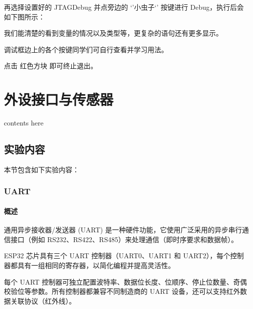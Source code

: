 \documentclass[a4paper,12pt,english]{sphinxmanual}
\begin{document}
{{\sphinxAtStartPar
再选择设置好的 JTAGDebug 并点旁边的 ‘’小虫子‘’ 按键进行 Debug，执行后会如下图所示：

\sphinxAtStartPar
{}

\sphinxAtStartPar
我们能清楚的看到变量的情况以及类型等，更复杂的语句还有更多显示。

\sphinxAtStartPar
调试框边上的各个按键同学们可自行查看并学习用法。

\sphinxAtStartPar
点击 红色方块 即可终止退出。

\sphinxAtStartPar
{}

\sphinxstepscope


\section{外设接口与传感器}
\label{\detokenize{exp-esp32/peripherals/index:id1}}\label{\detokenize{exp-esp32/peripherals/index::doc}}
\sphinxAtStartPar
contents here


\subsection{实验内容}
\label{\detokenize{exp-esp32/peripherals/index:id2}}
\sphinxAtStartPar
本节包含如下实验内容：

\sphinxstepscope


\subsubsection{UART}
\label{\detokenize{exp-esp32/peripherals/uart:uart}}\label{\detokenize{exp-esp32/peripherals/uart::doc}}

\paragraph{概述}
\label{\detokenize{exp-esp32/peripherals/uart:id1}}
\sphinxAtStartPar
通用异步接收器/发送器 (UART) 是一种硬件功能，它使用广泛采用的异步串行通信接口（例如 RS232、RS422、RS485）来处理通信（即时序要求和数据帧）。

\sphinxAtStartPar
ESP32 芯片具有三个 UART 控制器（UART0、UART1 和 UART2），每个控制器都具有一组相同的寄存器，以简化编程并提高灵活性。

\sphinxAtStartPar
每个 UART 控制器可独立配置波特率、数据位长度、位顺序、停止位数量、奇偶校验位等参数。所有控制器都兼容不同制造商的 UART 设备，还可以支持红外数据关联协议（红外线）。


}}
\end{document}
